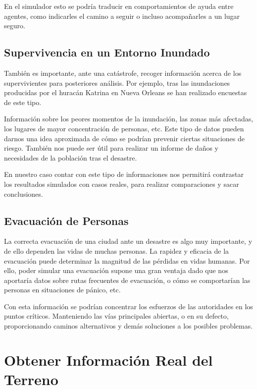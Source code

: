 En el simulador esto se podría traducir en comportamientos de ayuda entre
agentes, como indicarles el camino a seguir o incluso acompañarles a un
lugar seguro.

\subsection*{Supervivencia en un Entorno Inundado}

También es importante, ante una catástrofe, recoger información acerca de los
supervivientes para posteriores análisis. Por ejemplo, tras las inundaciones
producidas por el huracán Katrina en Nueva Orleans se han realizado
encuestas\cite{Washington05} de este tipo.

Información sobre los peores momentos de la inundación, las zonas más afectadas,
los lugares de mayor concentración de personas, etc. Este tipo de datos pueden
darnos una idea aproximada de cómo se podrían prevenir ciertas situaciones de
riesgo. También nos puede ser útil para realizar un informe de daños y
necesidades de la población tras el desastre.

En nuestro caso contar con este tipo de informaciones nos permitirá contrastar
los resultados simulados con casos reales, para realizar comparaciones y sacar
conclusiones.

\subsection*{Evacuación de Personas}

La correcta evacuación de una ciudad ante un desastre es algo muy importante, y
de ello dependen las vidas de muchas personas. La rapidez y eficacia de la
evacuación puede determinar la magnitud de las pérdidas en vidas humanas. Por
ello, poder simular una evacuación supone una gran ventaja dado que nos
aportaría datos sobre rutas frecuentes de evacuación\cite{Lammel08}, o cómo se
comportarían las personas en situaciones de pánico\cite{Chu05}, etc.

Con esta información se podrían concentrar los esfuerzos de las autoridades en
los puntos críticos. Manteniendo las vías principales abiertas, o en su defecto,
proporcionando caminos alternativos y demás soluciones a los posibles problemas.

\section*{Obtener Información Real del Terreno}

